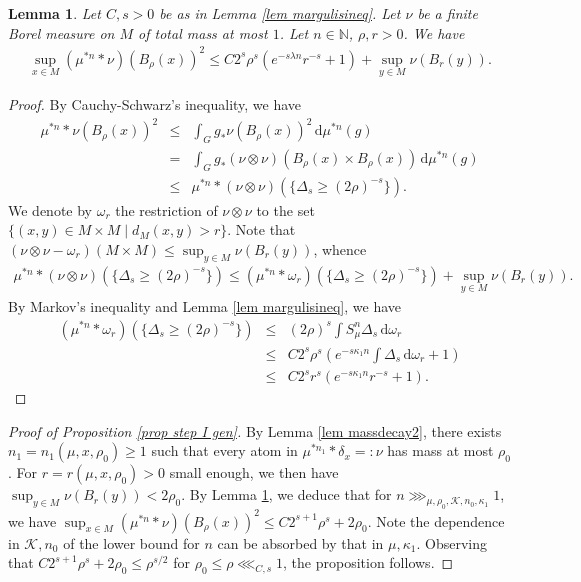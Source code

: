 \documentclass[11pt, leqno, fleqn]{amsart}
\def \N{{\mathbb N}}
\newcommand{\dd}{\,\mathrm{d}}
\newcommand{\cK}{{\mathcal K}}
\newcommand{\aryst}{\begin{eqnarray*}}
\newcommand{\earyst}{\end{eqnarray*}}
\newtheorem{lemma}[thm]{\bf Lemma}
\theoremstyle{definition}
\theoremstyle{definition}
\begin{document}
\begin{lemma} \label{lem massdecay1}
	Let   $C, s >0$  be as in Lemma \ref{lem margulisineq}. Let $\nu$ be a finite Borel measure on $M$ of total mass at most $1$. Let $n \in \N$, $\rho,r > 0$. We have
	\aryst
	\sup_{x \in M}	(\mu^{*n} * \nu)(B_\rho(x))^2 \leq C 2^s \rho^s( e^{- s \lambda n} r^{-s} + 1 ) + \sup_{y \in M} \nu(B_{r}(y)).
	\earyst
\end{lemma}

\begin{proof}
	By Cauchy-Schwarz's inequality, we have 
	\aryst
	\mu^{*n} * \nu( B_\rho(x) )^2 &\leq& \int_{G}  g_*\nu( B_\rho(x) )^2 \dd\mu^{* n}(g) \\
	&=& \int_{G} g_*( \nu \otimes \nu )(B_\rho(x) \times B_\rho(x))  \dd\mu^{* n}(g)\\
	&\leq&\mu^{* n} *(\nu \otimes \nu)( \{ \Delta_s \geq (2 \rho)^{-s} \} ).
	\earyst
	We denote by $\omega_{r}$ the restriction of $\nu \otimes \nu$ to the set $\{ (x, y) \in M \times M \mid d_{M}(x, y) > r \}$. Note that $(\nu \otimes \nu-\omega_{r})(M\times M)\leq\sup_{y \in M} \nu( B_{r}(y))$, whence
	\aryst
	\mu^{* n} *(\nu \otimes \nu)( \{ \Delta_s \geq (2 \rho)^{-s} \} ) \leq  ( \mu^{* n} * \omega_{r} )( \{ \Delta_s \geq (2 \rho)^{-s} \} ) + \sup_{y \in M} \nu( B_{r}(y)).
	\earyst
	By Markov's inequality and Lemma \ref{lem margulisineq},  we have 
	\aryst
	( \mu^{* n} * \omega_{r} )( \{ \Delta_s \geq (2 \rho)^{-s} \} )  &\leq& (2 \rho)^{s} \int  S_{\mu}^n \Delta_s  \dd\omega_{r} \\ 
	&\leq& C 2^s \rho^s( e^{- s\kappa_{1} n } \int \Delta_s \dd \omega_{r}  + 1 ) \\
	&\leq& C 2^s r^s(e^{- s\kappa_{1} n } r^{- s} + 1).
	\earyst
\end{proof}

 

\begin{proof}[Proof of Proposition \ref{prop step I gen}] 

By Lemma \ref{lem massdecay2}, there exists $n_{1}=n_{1}(\mu,x, \rho_{0})\geq1$ such  that every atom in $\mu^{*n_{1}}*\delta_{x}=:\nu$  has mass at most $\rho_{0}$.  For $r=r(\mu,x, \rho_{0})>0$ small enough, we then have $\sup_{y \in M} \nu(B_{r}(y))<2\rho_{0}$. By Lemma \ref{lem massdecay1}, we deduce that for $n\ggg_{\mu, \rho_{0}, \cK, n_{0}, \kappa_{1}}1$, we have $\sup_{x \in M}	(\mu^{*n} * \nu)(B_\rho(x))^2 \leq  C 2^{s+1} \rho^s+2\rho_{0}$. Note the dependence in $ \cK, n_{0}$ of the lower bound for $n$ can be absorbed by that in $\mu, \kappa_{1}$. Observing that $C 2^{s+1} \rho^s+2\rho_{0}\leq \rho^{s/2}$ for $\rho_{0}\leq \rho\lll_{C,s}1$,
the proposition follows.


\end{proof}
\end{document}
